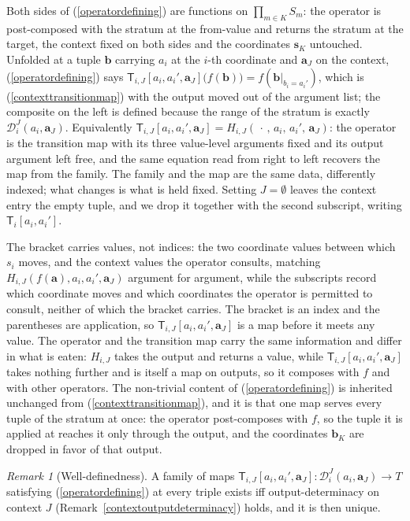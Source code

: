 \documentclass{article}
\theoremstyle{definition}
\theoremstyle{remark}
\newtheorem{remark}[proposition]{Remark}
\begin{document}
\noindent Both sides of (\ref{operatordefining}) are functions on $\prod_{m \in K} S_m$: the operator is post-composed with the stratum at the from-value and returns the stratum at the target, the context fixed on both sides and the coordinates $\boldsymbol{s}_K$ untouched. Unfolded at a tuple $\boldsymbol{b}$ carrying $a_i$ at the $i$-th coordinate and $\boldsymbol{a}_J$ on the context, (\ref{operatordefining}) says $\mathsf{T}_{i,J}[a_i, a_i', \boldsymbol{a}_J]\bigl(f(\boldsymbol{b})\bigr) = f(\boldsymbol{b}|_{b_i = a_i'})$, which is (\ref{contexttransitionmap}) with the output moved out of the argument list; the composite on the left is defined because the range of the stratum is exactly $\mathcal{D}_i^J(a_i, \boldsymbol{a}_J)$. Equivalently $\mathsf{T}_{i,J}[a_i, a_i', \boldsymbol{a}_J] = H_{i,J}(\,\cdot\,,\, a_i,\, a_i',\, \boldsymbol{a}_J)$: the operator is the transition map with its three value-level arguments fixed and its output argument left free, and the same equation read from right to left recovers the map from the family. The family and the map are the same data, differently indexed; what changes is what is held fixed. Setting $J = \emptyset$ leaves the context entry the empty tuple, and we drop it together with the second subscript, writing $\mathsf{T}_i[a_i, a_i']$.

\noindent The bracket carries values, not indices: the two coordinate values between which $s_i$ moves, and the context values the operator consults, matching $H_{i,J}(f(\boldsymbol{a}), a_i, a_i', \boldsymbol{a}_J)$ argument for argument, while the subscripts record which coordinate moves and which coordinates the operator is permitted to consult, neither of which the bracket carries. The bracket is an index and the parentheses are application, so $\mathsf{T}_{i,J}[a_i, a_i', \boldsymbol{a}_J]$ is a map before it meets any value. The operator and the transition map carry the same information and differ in what is eaten: $H_{i,J}$ takes the output and returns a value, while $\mathsf{T}_{i,J}[a_i, a_i', \boldsymbol{a}_J]$ takes nothing further and is itself a map on outputs, so it composes with $f$ and with other operators. The non-trivial content of (\ref{operatordefining}) is inherited unchanged from (\ref{contexttransitionmap}), and it is that one map serves every tuple of the stratum at once: the operator post-composes with $f$, so the tuple it is applied at reaches it only through the output, and the coordinates $\boldsymbol{b}_K$ are dropped in favor of that output.

\begin{remark}[Well-definedness]
\label{operatorwelldefined}
A family of maps $\mathsf{T}_{i,J}[a_i, a_i', \boldsymbol{a}_J] \colon \mathcal{D}_i^J(a_i, \boldsymbol{a}_J) \to T$ satisfying (\ref{operatordefining}) at every triple exists iff output-determinacy on context $J$ (Remark~\ref{contextoutputdeterminacy}) holds, and it is then unique.
\end{remark}
\end{document}
